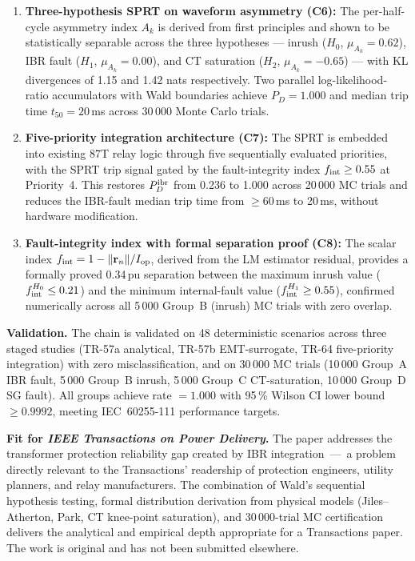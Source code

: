 \documentclass[11pt,a4paper]{article}
\begin{document}
\begin{enumerate}
  \item \textbf{Three-hypothesis SPRT on waveform asymmetry (C6):}
        The per-half-cycle asymmetry index $A_k$ is derived from first
        principles and shown to be statistically separable across the
        three hypotheses --- inrush ($H_0$, $\mu_{A_k} = 0.62$), IBR
        fault ($H_1$, $\mu_{A_k} = 0.00$), and CT saturation
        ($H_2$, $\mu_{A_k} = -0.65$) --- with KL divergences of
        1.15 and 1.42 nats respectively.
        Two parallel log-likelihood-ratio accumulators with Wald boundaries
        achieve $P_D = 1.000$ and median trip time $t_{50} = 20\,$ms across
        30\,000 Monte Carlo trials.

  \item \textbf{Five-priority integration architecture (C7):}
        The SPRT is embedded into existing 87T relay logic through five
        sequentially evaluated priorities, with the SPRT trip signal gated
        by the fault-integrity index $f_{\rm int} \geq 0.55$ at Priority~4.
        This restores $P_D^{\rm ibr}$ from 0.236 to 1.000 across 20\,000
        MC trials and reduces the IBR-fault median trip time from
        $\geq 60\,$ms to 20\,ms, without hardware modification.

  \item \textbf{Fault-integrity index with formal separation proof (C8):}
        The scalar index $f_{\rm int} = 1 - \|\mathbf{r}_n\|/I_{\rm op}$,
        derived from the LM estimator residual, provides a formally proved
        0.34\,pu separation between the maximum inrush value
        ($f_{\rm int}^{H_0} \leq 0.21$) and the minimum internal-fault
        value ($f_{\rm int}^{H_1} \geq 0.55$), confirmed numerically across
        all 5\,000 Group~B (inrush) MC trials with zero overlap.
\end{enumerate}

\medskip\noindent\textbf{Validation.}
The chain is validated on 48 deterministic scenarios across three staged
studies (TR-57a analytical, TR-57b EMT-surrogate, TR-64 five-priority
integration) with zero misclassification, and on 30\,000 MC trials
(10\,000 Group~A IBR fault, 5\,000 Group~B inrush, 5\,000 Group~C
CT-saturation, 10\,000 Group~D SG fault).
All groups achieve rate $= 1.000$ with 95\,\% Wilson CI lower bound
$\geq 0.9992$, meeting IEC~60255-111 performance targets.

\medskip\noindent\textbf{Fit for \textit{IEEE Transactions on Power Delivery}.}
The paper addresses the transformer protection reliability gap created by
IBR integration~---~a problem directly relevant to the Transactions'
readership of protection engineers, utility planners, and relay manufacturers.
The combination of Wald's sequential hypothesis testing, formal distribution
derivation from physical models (Jiles--Atherton, Park, CT knee-point
saturation), and 30\,000-trial MC certification delivers the analytical and
empirical depth appropriate for a Transactions paper.
The work is original and has not been submitted elsewhere.
\end{document}
